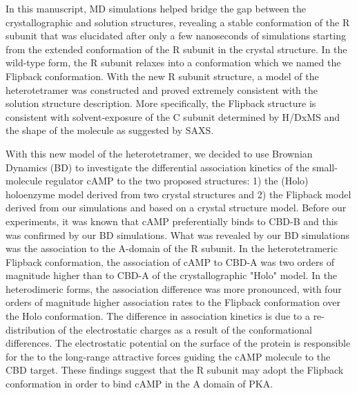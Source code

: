 \documentclass[12pt]{ucsddissertation}
\begin{document}
In this manuscript, MD simulations helped bridge the gap between the crystallographic and solution structures, revealing a stable conformation of the R subunit that was elucidated after only a few nanoseconds of simulations starting from the extended conformation of the R subunit in the crystal structure. In the wild-type form, the R subunit relaxes into a conformation which we named the Flipback conformation. With the new R subunit structure, a model of the heterotetramer was constructed and proved extremely consistent with the solution structure description. More specifically, the Flipback structure is consistent with solvent-exposure of the C subunit determined by H/DxMS and the shape of the molecule as suggested by SAXS. 

With this new  model of the heterotetramer, we decided to use Brownian Dynamics (BD) to investigate the differential association kinetics of the small-molecule regulator cAMP to the two proposed structures: 1) the (Holo) holoenzyme model derived from two crystal structures and 2) the Flipback model derived from our simulations and based on a crystal structure model. Before our experiments, it was known that cAMP preferentially binds to CBD-B and this was confirmed by our BD simulations.  What was revealed by our BD simulations was the association to the A-domain of the R subunit. In the heterotetrameric Flipback conformation, the association of cAMP to CBD-A was two orders of magnitude higher than to CBD-A of the crystallographic "Holo"  model. In the heterodimeric forms, the association difference was more pronounced, with four orders of magnitude higher association rates to the Flipback conformation over the Holo conformation. The difference in association kinetics is due to a re-distribution of the electrostatic charges as a result of the conformational differences. The electrostatic potential on the surface of the protein is responsible for the to the long-range attractive forces guiding the cAMP molecule to the CBD target. These findings suggest that the R subunit may adopt the Flipback conformation in order to bind cAMP in the A domain of PKA.
\end{document}
